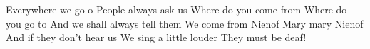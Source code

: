 \beginchorus
Everywhere we go-o 
People always ask us 
Where do you come from 
Where do you go to 
And we shall always tell them 	
We come from Nienof 
Mary mary Nienof 
And if they don’t hear us 
We sing a little louder 	
\endchorus
\beginchorus
They must be deaf!
\endchorus
\endsong